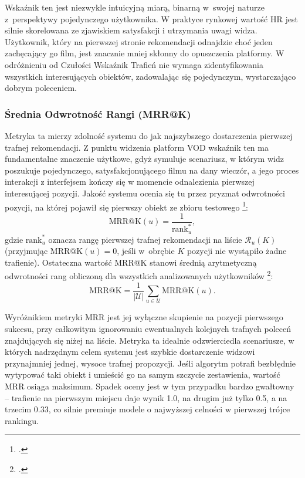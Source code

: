 Wskaźnik ten jest niezwykle intuicyjną miarą, binarną w~swojej naturze z~perspektywy pojedynczego użytkownika. W praktyce rynkowej wartość HR jest silnie skorelowana ze zjawiskiem satysfakcji i utrzymania uwagi widza. Użytkownik, który na pierwszej stronie rekomendacji odnajdzie choć jeden zachęcający go film, jest znacznie mniej skłonny do opuszczenia platformy. W odróżnieniu od Czułości Wskaźnik Trafień nie wymaga zidentyfikowania wszystkich interesujących obiektów, zadowalając się pojedynczym, wystarczająco dobrym poleceniem.

\subsubsection{Średnia Odwrotność Rangi (MRR@K)}
Metryka ta mierzy zdolność systemu do jak najszybszego dostarczenia pierwszej trafnej rekomendacji. Z punktu widzenia platform VOD wskaźnik ten ma fundamentalne znaczenie użytkowe, gdyż symuluje scenariusz, w którym widz poszukuje pojedynczego, satysfakcjonującego filmu na dany wieczór, a jego proces interakcji z interfejsem kończy się w momencie odnalezienia pierwszej interesującej pozycji. Jakość systemu ocenia się tu przez pryzmat odwrotności pozycji, na której pojawił się pierwszy obiekt ze zbioru testowego \footcite[34]{krawczukSystemyRekomendacyjne2024}:
\begin{equation}
    \text{MRR@K}(u) = \frac{1}{\text{rank}_u^*},
\end{equation}
gdzie $\text{rank}_u^*$ oznacza rangę pierwszej trafnej rekomendacji na liście $\mathcal{R}_u(K)$ (przyjmując $\text{MRR@K}(u) = 0$, jeśli w~obrębie $K$ pozycji nie wystąpiło żadne trafienie). Ostateczna wartość MRR@K stanowi średnią arytmetyczną odwrotności rang obliczoną dla wszystkich analizowanych użytkowników \footcite[34]{krawczukSystemyRekomendacyjne2024}:
\begin{equation}
    \text{MRR@K} = \frac{1}{|\mathcal{U}|} \sum_{u \in \mathcal{U}} \text{MRR@K}(u).
\end{equation}

Wyróżnikiem metryki MRR jest jej wyłączne skupienie na pozycji pierwszego sukcesu, przy całkowitym ignorowaniu ewentualnych kolejnych trafnych poleceń znajdujących się niżej na liście. Metryka ta idealnie odzwierciedla scenariusze, w których nadrzędnym celem systemu jest szybkie dostarczenie widzowi przynajmniej jednej, wysoce trafnej propozycji. Jeśli algorytm potrafi bezbłędnie wytypować taki obiekt i umieścić go na samym szczycie zestawienia, wartość MRR osiąga maksimum. Spadek oceny jest w tym przypadku bardzo gwałtowny -- trafienie na pierwszym miejscu daje wynik 1.0, na drugim już tylko 0.5, a na trzecim 0.33, co silnie premiuje modele o najwyższej celności w pierwszej trójce rankingu.

